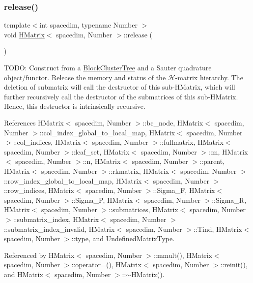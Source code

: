 \subsubsection{\texorpdfstring{release()}{release()}}
{\footnotesize\ttfamily template$<$int spacedim, typename Number $>$ \\
void \hyperlink{classHMatrix}{H\+Matrix}$<$ spacedim, Number $>$\+::release (\begin{DoxyParamCaption}{ }\end{DoxyParamCaption})}

T\+O\+DO\+: Construct from a \hyperlink{classBlockClusterTree}{Block\+Cluster\+Tree} and a Sauter quadrature object/functor. Release the memory and status of the $\mathcal{H}$-\/matrix hierarchy. The deletion of {\ttfamily submatrix} will call the destructor of this sub-\/\+H\+Matrix, which will further recursively call the destructor of the submatrices of this sub-\/\+H\+Matrix. Hence, this destructor is intrinsically recursive.

References H\+Matrix$<$ spacedim, Number $>$\+::bc\+\_\+node, H\+Matrix$<$ spacedim, Number $>$\+::col\+\_\+index\+\_\+global\+\_\+to\+\_\+local\+\_\+map, H\+Matrix$<$ spacedim, Number $>$\+::col\+\_\+indices, H\+Matrix$<$ spacedim, Number $>$\+::fullmatrix, H\+Matrix$<$ spacedim, Number $>$\+::leaf\+\_\+set, H\+Matrix$<$ spacedim, Number $>$\+::m, H\+Matrix$<$ spacedim, Number $>$\+::n, H\+Matrix$<$ spacedim, Number $>$\+::parent, H\+Matrix$<$ spacedim, Number $>$\+::rkmatrix, H\+Matrix$<$ spacedim, Number $>$\+::row\+\_\+index\+\_\+global\+\_\+to\+\_\+local\+\_\+map, H\+Matrix$<$ spacedim, Number $>$\+::row\+\_\+indices, H\+Matrix$<$ spacedim, Number $>$\+::\+Sigma\+\_\+F, H\+Matrix$<$ spacedim, Number $>$\+::\+Sigma\+\_\+P, H\+Matrix$<$ spacedim, Number $>$\+::\+Sigma\+\_\+R, H\+Matrix$<$ spacedim, Number $>$\+::submatrices, H\+Matrix$<$ spacedim, Number $>$\+::submatrix\+\_\+index, H\+Matrix$<$ spacedim, Number $>$\+::submatrix\+\_\+index\+\_\+invalid, H\+Matrix$<$ spacedim, Number $>$\+::\+Tind, H\+Matrix$<$ spacedim, Number $>$\+::type, and Undefined\+Matrix\+Type.



Referenced by H\+Matrix$<$ spacedim, Number $>$\+::mmult(), H\+Matrix$<$ spacedim, Number $>$\+::operator=(), H\+Matrix$<$ spacedim, Number $>$\+::reinit(), and H\+Matrix$<$ spacedim, Number $>$\+::$\sim$\+H\+Matrix().

\mbox{\label{classHMatrix_a9e023f39b1f8916117a63557895a91b4}} 
